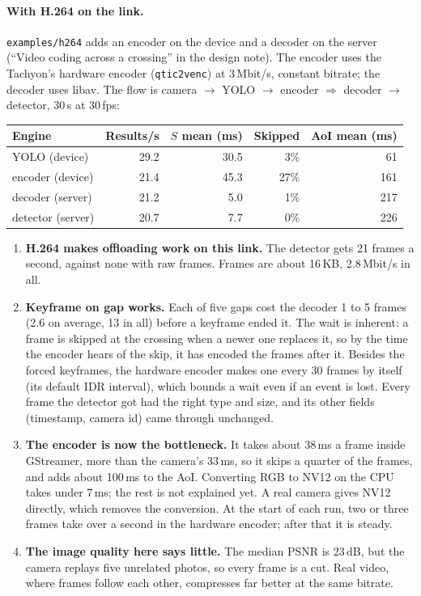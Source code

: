 \documentclass[11pt]{article}
\newcommand{\code}[1]{\texttt{#1}}
\begin{document}
\paragraph{With H.264 on the link.} \code{examples/h264} adds an encoder on
the device and a decoder on the server (``Video coding across a crossing'' in
the design note). The encoder uses the Tachyon's hardware encoder
(\code{qtic2venc}) at 3\,Mbit/s, constant bitrate; the decoder uses libav.
The flow is camera $\to$ YOLO $\to$ encoder $\Rightarrow$ decoder $\to$
detector, 30\,s at 30\,fps:
\begin{center}
\small
\begin{tabular}{@{}lrrrr@{}}
\toprule
Engine & Results/s & $S$ mean (ms) & Skipped & AoI mean (ms) \\
\midrule
YOLO (device)     & 29.2 & 30.5 & 3\%  & 61 \\
encoder (device)  & 21.4 & 45.3 & 27\% & 161 \\
decoder (server)  & 21.2 & 5.0  & 1\%  & 217 \\
detector (server) & 20.7 & 7.7  & 0\%  & 226 \\
\bottomrule
\end{tabular}
\end{center}
\begin{enumerate}[nosep]
  \item \textbf{H.264 makes offloading work on this link.} The detector gets
        21 frames a second, against none with raw frames. Frames are about
        16\,KB, 2.8\,Mbit/s in all.
  \item \textbf{Keyframe on gap works.} Each of five gaps cost the decoder
        1 to 5 frames (2.6 on average, 13 in all) before a keyframe ended it.
        The wait is inherent: a frame is skipped at the crossing when a newer
        one replaces it, so by the time the encoder hears of the skip, it has
        encoded the frames after it. Besides the forced keyframes, the
        hardware encoder makes one every 30 frames by itself (its default
        IDR interval), which bounds a wait even if an event is lost. Every
        frame the detector got had the right type and size, and its other
        fields (timestamp, camera id) came through unchanged.
  \item \textbf{The encoder is now the bottleneck.} It takes about 38\,ms a
        frame inside GStreamer, more than the camera's 33\,ms, so it skips a
        quarter of the frames, and adds about 100\,ms to the AoI. Converting
        RGB to NV12 on the CPU takes under 7\,ms; the rest is not explained
        yet. A real camera gives NV12 directly, which removes the conversion.
        At the start of each run, two or three frames take over a second in
        the hardware encoder; after that it is steady.
  \item \textbf{The image quality here says little.} The median PSNR is
        23\,dB, but the camera replays five unrelated photos, so every frame
        is a cut. Real video, where frames follow each other, compresses far
        better at the same bitrate.
\end{enumerate}
\end{document}
